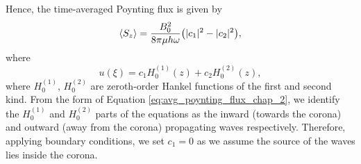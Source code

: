 Hence, the time-averaged Poynting flux is given by
\begin{equation}
    \label{eq:avg_poynting_flux_chap_2}
    \langle S_z\rangle=\frac{B_0^2}{8\pi\mu h\omega}\qty(|c_1|^2-|c_2|^2),
\end{equation}
where
\begin{equation}
    u(\xi) = c_1H_0^{(1)}(z) + c_2H_0^{(2)}(z),
\end{equation}
where $H_0^{(1)}$, $H_0^{(2)}$ are zeroth-order Hankel functions of the first and second kind. From the form of Equation \eqref{eq:avg_poynting_flux_chap_2}, we identify the $H_0^{{(1)}}$ and $H_0^{(2)}$ parts of the equations as the inward (towards the corona) and outward (away from the corona) propagating waves respectively. Therefore, applying boundary conditions, we set $c_1=0$ as we assume the source of the waves lies inside the corona.

